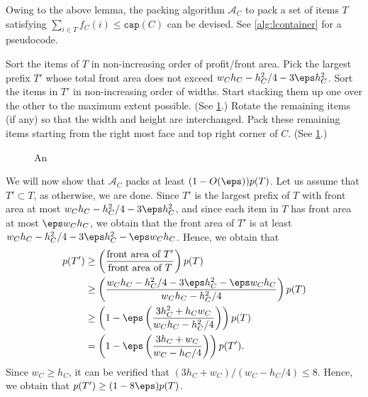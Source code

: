 Owing to the above lemma, the packing algorithm $\mathcal A_C$ to pack a set of items $T$ satisfying $\sum_{i\in T}f_C(i)\le \mathtt{cap}(C)$ can be devised. See \cref{alg:lcontainer} for a pseudocode.
\begin{algorithm}[h]
    \caption{$\mathcal A_C$ for an \LContainer{} given an input set $T$ satisfying $f_C(T)\le \mathtt{cap}(C)$}
    \begin{algorithmic}[1]
        \State Sort the items of $T$ in non-increasing order of profit/front area.
        \State Pick the largest prefix $T'$ whose total front area does not exceed $w_C h_C-h_C^2/4-3\eps h_C^2$.
        \State Sort the items in $T'$ in non-increasing order of widths.
        \State Start stacking them up one over the other to the maximum extent possible. (See \cref{fig:l-container-2}.)
        \State Rotate the remaining items (if any) so that the width and height are interchanged.
        \State Pack these remaining items starting from the right most face and top right corner of $C$. (See \cref{fig:l-container-2}.)
    \end{algorithmic}
    \label{alg:lcontainer}
\end{algorithm}

\begin{figure}
    \centering
    
    \caption{An \LContainer}
    \label{fig:l-container-2}
\end{figure}

We will now show that $\mathcal A_C$ packs at least $(1-O(\eps))p(T)$.
Let us assume that $T'\subset T$, as otherwise, we are done. Since $T'$ is the largest prefix of $T$ with front area at most
$w_C h_C-h_C^2/4-3\eps h_C^2$, and since each item in $T$ has front area at most $\eps w_Ch_C$,
we obtain that the front area of $T'$ is at least $w_C h_C-h_C^2/4-3\eps h_C^2-\eps w_Ch_C$. Hence, we obtain that
\begin{align*}
    p(T')&\ge \left(\frac{\text{front area of }T'}{\text{front area of } T}\right)p(T)\\
        &\ge \left(\frac{w_C h_C-h_C^2/4-3\eps h_C^2-\eps w_Ch_C}{w_C h_C-h_C^2/4}\right)p(T)\\
        &\ge\left(1-\eps\left(\frac{3h_C^2+h_Cw_C}{w_Ch_C-h_C^2/4}\right)\right)p(T)\\
        &= \left(1-\eps\left(\frac{3h_C+w_C}{w_C-h_C/4}\right)\right)p(T').
\end{align*}
Since $w_C\ge h_C$, it can be verified that $(3h_C+w_C)/(w_C-h_C/4)\le 8$. Hence, we obtain that $p(T')\ge (1-8\eps)p(T)$.
